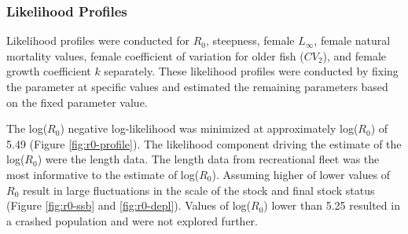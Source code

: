\documentclass[11pt,
  english,
  a4paper,
]{article}
\begin{document}
\leavevmode\tagmcend\tagstructend\par


\hypertarget{likelihood-profiles}{%
\subsubsection{Likelihood Profiles}\label{likelihood-profiles}}

\leavevmode\tagmcend\tagstructend


Likelihood profiles were conducted for {\(R_0\)\leavevmode\tagmcend\tagstructend}, steepness, female {\(L_{\infty}\)\leavevmode\tagmcend\tagstructend}, female natural mortality values, female coefficient of variation for older fish ({\(CV_2\)\leavevmode\tagmcend\tagstructend}), and female growth coefficient {\(k\)\leavevmode\tagmcend\tagstructend} separately. These likelihood profiles were conducted by fixing the parameter at specific values and estimated the remaining parameters based on the fixed parameter value.

\leavevmode\tagmcend\tagstructend\par


The log({\(R_0\)\leavevmode\tagmcend\tagstructend}) negative log-likelihood was minimized at approximately log({\(R_0\)\leavevmode\tagmcend\tagstructend}) of 5.49 (Figure \ref{fig:r0-profile}). The likelihood component driving the estimate of the log({\(R_0\)\leavevmode\tagmcend\tagstructend}) were the length data. The length data from recreational fleet was the most informative to the estimate of log({\(R_0\)\leavevmode\tagmcend\tagstructend}). Assuming higher of lower values of {\(R_0\)\leavevmode\tagmcend\tagstructend} result in large fluctuations in the scale of the stock and final stock status (Figure \ref{fig:r0-ssb} and \ref{fig:r0-depl}). Values of log({\(R_0\)\leavevmode\tagmcend\tagstructend}) lower than 5.25 resulted in a crashed population and were not explored further.
\end{document}
